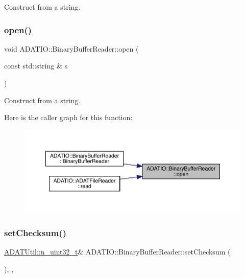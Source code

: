 Construct from a string. 

\mbox{\label{classADATIO_1_1BinaryBufferReader_af56c8d00474a1f38f38267c45aa7b433}} 
\subsubsection{\texorpdfstring{open()}{open()}\hspace{0.1cm}{\footnotesize\ttfamily [3/3]}}
{\footnotesize\ttfamily void A\+D\+A\+T\+I\+O\+::\+Binary\+Buffer\+Reader\+::open (\begin{DoxyParamCaption}\item[{const std\+::string \&}]{s }\end{DoxyParamCaption})}



Construct from a string. 

Here is the caller graph for this function\+:
\nopagebreak
\begin{figure}[H]
\begin{center}
\leavevmode
\includegraphics[width=350pt]{d0/df3/classADATIO_1_1BinaryBufferReader_af56c8d00474a1f38f38267c45aa7b433_icgraph}
\end{center}
\end{figure}
\mbox{\label{classADATIO_1_1BinaryBufferReader_a3976e5ece3392d04158307f864a84bb7}} 
\subsubsection{\texorpdfstring{setChecksum()}{setChecksum()}\hspace{0.1cm}{\footnotesize\ttfamily [1/3]}}
{\footnotesize\ttfamily \mbox{\hyperlink{namespaceADATUtil_ad945a8afa4db2d1f89b731964adae97e}{A\+D\+A\+T\+Util\+::n\+\_\+uint32\+\_\+t}}\& A\+D\+A\+T\+I\+O\+::\+Binary\+Buffer\+Reader\+::set\+Checksum (\begin{DoxyParamCaption}{ }\end{DoxyParamCaption})\hspace{0.3cm}{\ttfamily [inline]}, {\ttfamily [protected]}, {\ttfamily [virtual]}}



